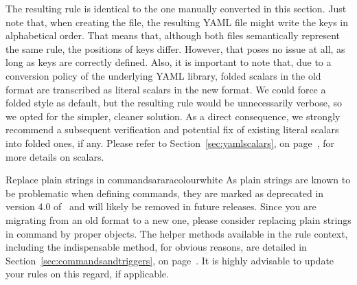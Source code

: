 
The resulting rule is identical to the one manually converted in this section. Just note that, when creating the file, the resulting YAML file might write the keys in alphabetical order. That means that, although both files semantically represent the same rule, the positions of keys differ. However, that poses no issue at all, as long as keys are correctly defined. Also, it is important to note that, due to a conversion policy of the underlying YAML library, folded scalars in the old format are transcribed as literal scalars in the new format. We could force a folded style as default, but the resulting rule would be unnecessarily verbose, so we opted for the simpler, cleaner solution. As a direct consequence, we strongly recommend a subsequent verification and potential fix of existing literal scalars into folded ones, if any. Please refer to Section~\ref{sec:yamlscalars}, on page~\pageref{sec:yamlscalars}, for more details on scalars.

\begin{messagebox}{Replace plain strings in commands}{araracolour}{\icattention}{white}
As plain strings are known to be problematic when defining commands, they are marked as deprecated in version 4.0 of \arara\ and will likely be removed in future releases. Since you are migrating from an old format to a new one, please consider replacing plain strings in command by proper  objects. The helper methods available in the rule context, including the indispensable  method, for obvious reasons, are detailed in Section~\ref{sec:commandsandtriggers}, on page~\pageref{sec:commandsandtriggers}. It is highly advisable to update your rules on this regard, if applicable.
\end{messagebox}

